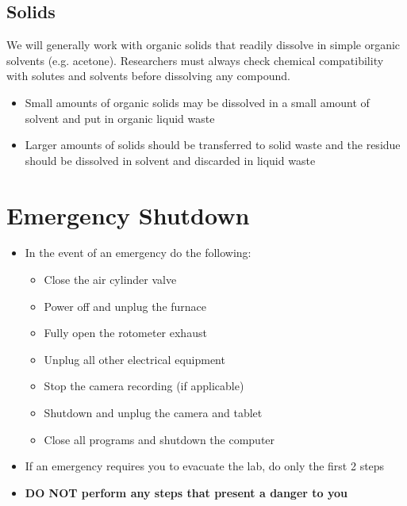 \documentclass[letterpaper,11pt]{article}
\begin{document}
    \subsection{Solids} \label{sec:spill_solid}
    We will generally work with organic solids that readily dissolve in simple
    organic solvents (e.g. acetone). Researchers must always check chemical 
    compatibility with solutes and solvents before dissolving any compound.
    \begin{itemize}
    \item Small amounts of organic solids may be dissolved in a small amount of 
        solvent and put in organic liquid waste
    \item Larger amounts of solids should be transferred to solid waste and the
        residue should be dissolved in solvent and discarded in liquid waste
    \end{itemize}

\newpage    
\section{Emergency Shutdown} \label{sec:e_shtdn}

    \begin{itemize}
    \item In the event of an emergency do the following:
        
        \begin{itemize}
        \item Close the air cylinder valve
        \item Power off and unplug the furnace
        \item Fully open the rotometer exhaust
        \item Unplug all other electrical equipment
        \item Stop the camera recording (if applicable)
        \item Shutdown and unplug the camera and tablet
        \item Close all programs and shutdown the computer
        \end{itemize}
    
    \item If an emergency requires you to evacuate the lab, do only the first 
        2 steps
    \item \textbf{DO NOT perform any steps that present a danger to you}
    \end{itemize}
\end{document}
